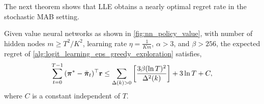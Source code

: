 The next theorem shows that LLE obtains a nearly optimal regret rate in the stochastic MAB setting.
\begin{thm}
\label{thm:logit_learning_main_result}
    Given value neural networks as shown in \cref{fig:nn_policy_value}, with number of hidden nodes $m \ge T^2 / K^2$, learning rate $\eta = \frac{1}{K m}$,  $\alpha > 3$, and $\beta > 256$, the expected regret of \cref{alg:logit_learning_eps_greedy_exploration} satisfies,
\begin{equation*}
\begin{split}
    \sum\limits_{t=0}^{T-1}{ ( {{\boldsymbol{\pi}}^*} - \tilde{{\boldsymbol{\pi}}}_t)^\top {\mathbf{r}} } \le \sum\limits_{\Delta(k) > 0}{ \left[ \frac{ 3 \beta ( \ln{T} )^2}{\Delta^2(k)} \right] }  + 3 \ln{T} + C,
\end{split}
\end{equation*}
where $C$ is a constant independent of $T$.
\end{thm}
